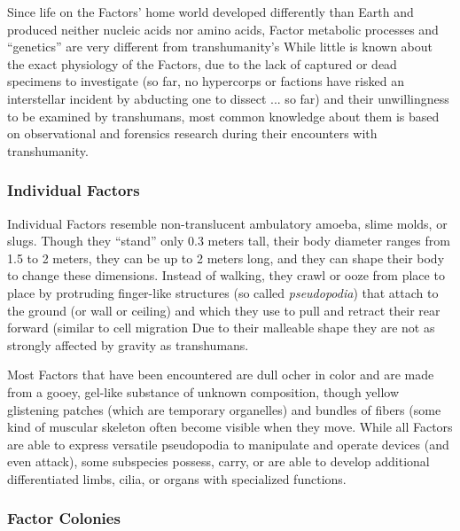 Since life on the Factors' home world developed 
differently than Earth and produced neither nucleic 
acids nor amino acids, Factor metabolic processes 
and ``genetics'' are very different from transhumanity's
While little is known about the exact physiology
of the Factors, due to the lack of captured or dead 
specimens to investigate (so far, no hypercorps or factions
have risked an interstellar incident by abducting
one to dissect ... so far) and their unwillingness to be 
examined by transhumans, most common knowledge 
about them is based on observational and forensics 
research during their encounters with transhumanity. 

\subsubsection{Individual Factors}

Individual Factors resemble non-translucent ambulatory
amoeba, slime molds, or slugs. Though they
``stand'' only 0.3 meters tall, their body diameter 
ranges from 1.5 to 2 meters, they can be up to 2 
meters long, and they can shape their body to change 
these dimensions. Instead of walking, they crawl or 
ooze from place to place by protruding finger-like 
structures (so called \textit{pseudopodia}) that attach to the 
ground (or wall or ceiling) and which they use to pull 
and retract their rear forward (similar to cell migration
Due to their malleable shape they are not as
strongly affected by gravity as transhumans.

Most Factors that have been encountered are dull 
ocher in color and are made from a gooey, gel-like 
substance of unknown composition, though yellow 
glistening patches (which are temporary organelles) 
and bundles of fibers (some kind of muscular skeleton
often become visible when they move. While
all Factors are able to express versatile pseudopodia 
to manipulate and operate devices (and even attack), 
some subspecies possess, carry, or are able to develop 
additional differentiated limbs, cilia, or organs with 
specialized functions.

\subsubsection{Factor Colonies}

